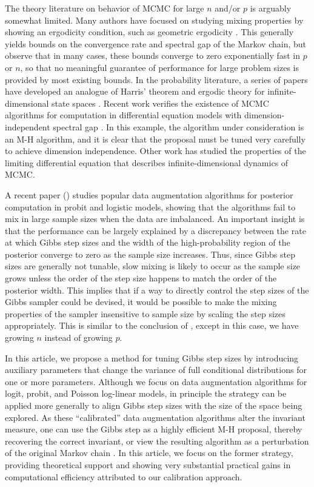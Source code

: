 \documentclass[12pt]{article}
\begin{document}
The theory literature on behavior of MCMC for large $n$ and/or $p$ is arguably somewhat limited. Many authors have focused on studying mixing properties by showing 
an ergodicity condition, such as geometric ergodicity \citep{roberts2004general,meyn2012markov}. This generally yields bounds on the convergence rate and spectral gap of the Markov chain, but \cite{rajaratnam2015mcmc} observe that in many cases, these bounds converge to zero exponentially fast in $p$ or $n$, so that no meaningful guarantee of performance for large problem sizes is provided by most existing bounds. In the probability literature, a series of papers have developed an analogue of Harris' theorem and ergodic theory for infinite-dimensional state spaces \citep{hairer2011asymptotic}. Recent work verifies the existence of MCMC algorithms for computation in differential equation models with dimension-independent spectral gap \citep{hairer2014spectral}. In this example, the algorithm under consideration is an M-H algorithm, and it is clear that the proposal must be tuned very carefully to achieve dimension independence. Other work has studied the properties of the limiting differential equation that describes infinite-dimensional dynamics of MCMC.

A recent paper (\cite{johndrow2016inefficiency}) studies popular data augmentation algorithms for posterior computation in probit \citep{albert1993bayesian} and logistic  \citep{polson2013bayesian} models, showing that the algorithms fail to mix in large sample sizes when the data are imbalanced. An important insight is that the performance can be largely explained by a discrepancy between the rate at which Gibbs step sizes and the width of the high-probability region of the posterior converge to zero as the sample size increases. Thus, since Gibbs step sizes are generally not tunable, slow mixing is likely to occur as the sample size grows unless the order of the step size happens to match the order of the posterior width. This implies that if a way to directly control the step sizes of the Gibbs sampler could be devised, it would be possible to make the mixing properties of the sampler insensitive to sample size by scaling the step sizes appropriately. This is similar to the conclusion of \cite{hairer2014spectral}, except in this case, we have growing $n$ instead of growing $p$.

In this article, we propose a method for tuning Gibbs step sizes by introducing auxiliary parameters that change the variance of full conditional distributions for one or more parameters. Although we focus on data augmentation algorithms for logit, probit, and Poisson log-linear models, in principle the strategy can be applied more generally to align Gibbs step sizes with the size of the space being explored. As these ``calibrated'' data augmentation algorithms alter the invariant measure, one can use the Gibbs step as a highly efficient M-H proposal, thereby recovering the correct invariant, or view the resulting algorithm as a perturbation of the original Markov chain \citep{tran2016adaptive}. In this article, we focus on the former strategy, providing theoretical support and showing very substantial practical gains in computational efficiency attributed to our calibration approach.
\end{document}
